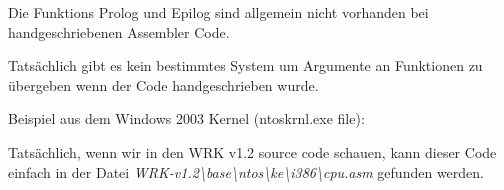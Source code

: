 \par Die Funktions Prolog und Epilog sind allgemein nicht vorhanden bei handgeschriebenen Assembler Code.

\par Tats\"achlich gibt es kein bestimmtes System um Argumente an Funktionen zu \"ubergeben wenn der Code handgeschrieben wurde. 

\par Beispiel aus dem Windows 2003 Kernel (ntoskrnl.exe file):



Tats\"achlich, wenn wir in den \ac{WRK} v1.2 source code schauen, kann dieser Code einfach in der Datei
\emph{WRK-v1.2\textbackslash{}base\textbackslash{}ntos\textbackslash{}ke\textbackslash{}i386\textbackslash{}cpu.asm} gefunden werden.

